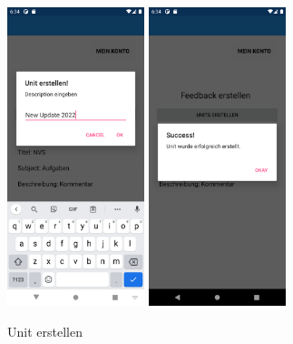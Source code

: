 \begin{figure}[h]
    \begin{center}
        \includegraphics[width=4cm]{pics/Xamarin Lehrer/7.png}\hfill
        \includegraphics[width=4cm]{pics/Xamarin Lehrer/8.png}
        \caption[HomePage]{Unit erstellen}
    \end{center}
\end{figure}
\newpage

